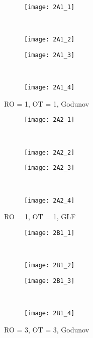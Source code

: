 \documentclass[10pt,letterpaper,fleqn]{article}
\begin{document}
\begin{figure}[h!]
        \centering
        \begin{subfigure}[b]{0.4\textwidth}
                \texttt{[image: 2A1\_1]}
        \end{subfigure}%
        ~ 
        \begin{subfigure}[b]{0.4\textwidth}
                \texttt{[image: 2A1\_2]}
        \end{subfigure}
        
        \begin{subfigure}[b]{0.4\textwidth}
                \texttt{[image: 2A1\_3]}
        \end{subfigure}
        ~
        \begin{subfigure}[b]{0.4\textwidth}
                \texttt{[image: 2A1\_4]}
        \end{subfigure}
        \caption{RO = 1, OT = 1, Godunov}
\end{figure}

\begin{figure}[h!]
        \centering
        \begin{subfigure}[b]{0.4\textwidth}
                \texttt{[image: 2A2\_1]}
        \end{subfigure}%
        ~ 
        \begin{subfigure}[b]{0.4\textwidth}
                \texttt{[image: 2A2\_2]}
        \end{subfigure}
        
        \begin{subfigure}[b]{0.4\textwidth}
                \texttt{[image: 2A2\_3]}
        \end{subfigure}
        ~
        \begin{subfigure}[b]{0.4\textwidth}
                \texttt{[image: 2A2\_4]}
        \end{subfigure}
        \caption{RO = 1, OT = 1, GLF}
\end{figure}

\begin{figure}[h!]
        \centering
        \begin{subfigure}[b]{0.4\textwidth}
                \texttt{[image: 2B1\_1]}
        \end{subfigure}%
        ~ 
        \begin{subfigure}[b]{0.4\textwidth}
                \texttt{[image: 2B1\_2]}
        \end{subfigure}
        
        \begin{subfigure}[b]{0.4\textwidth}
                \texttt{[image: 2B1\_3]}
        \end{subfigure}
        ~
        \begin{subfigure}[b]{0.4\textwidth}
                \texttt{[image: 2B1\_4]}
        \end{subfigure}
        \caption{RO = 3, OT = 3, Godunov}
\end{figure}
\end{document}
